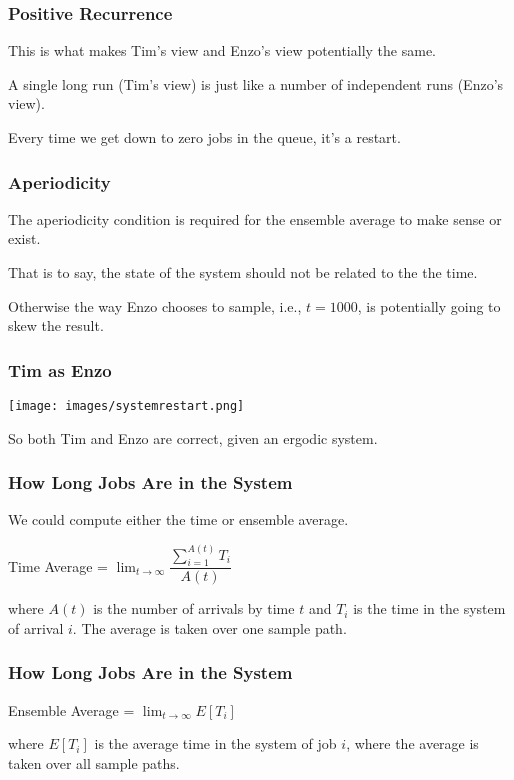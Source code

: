 \begin{frame}
\frametitle{Positive Recurrence}

This is what makes Tim's view and Enzo's view potentially the same. 

A single long run (Tim's view) is just like a number of independent runs (Enzo's view). 

Every time we get down to zero jobs in the queue, it's a restart. 

\end{frame}



\begin{frame}
\frametitle{Aperiodicity}

The \alert{aperiodicity} condition is required for the ensemble average to make sense or exist. 

That is to say, the state of the system should not be related to the the time.

Otherwise the way Enzo chooses to sample, i.e., $t = 1000$, is potentially going to skew the result.

\end{frame}



\begin{frame}
\frametitle{Tim as Enzo}

\begin{center}
	\texttt{[image: images/systemrestart.png]}
\end{center}

So both Tim and Enzo are correct, given an ergodic system.


\end{frame}



\begin{frame}
\frametitle{How Long Jobs Are in the System}

We could compute either the time or ensemble average. 

\begin{center}
	Time Average = $\lim_{t\to\infty}\dfrac{\sum_{i=1}^{A(t)} T_{i}}{A(t)}$
\end{center}

where $A(t)$ is the number of arrivals by time $t$ and $T_{i}$ is the time in the system of arrival $i$. The average is taken over one sample path.


\end{frame}

\begin{frame}
\frametitle{How Long Jobs Are in the System}

\begin{center}
	Ensemble Average = $\lim_{t\to\infty}E[T_{i}]$
\end{center}

where $E[T_{i}]$ is the average time in the system of job $i$, where the average is taken over all sample paths.


\end{frame}

